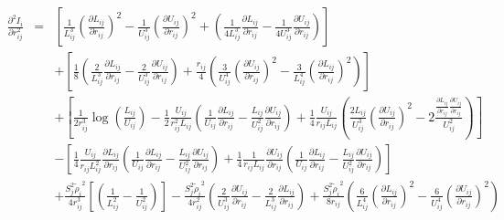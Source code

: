 \documentclass[12pt]{article}
\begin{document}
\begin{eqnarray}
\label{eq:BurialTerm2ndDerv}
\frac{\partial^{2}I_{i}}{\partial r_{ij}^{2}} & = & \left[ \frac{1}{L_{ij}^{3}}\left(\frac{\partial L_{ij}}{\partial r_{ij}}\right)^{2}
- \frac{1}{U_{ij}^{3}}\left(\frac{\partial U_{ij}}{\partial r_{ij}}\right)^{2} + \left(\frac{1}{4L_{ij}^{3}}\frac{\partial L_{ij}}{\partial r_{ij}} - \frac{1}{4U_{ij}^{3}}\frac{\partial U_{ij}}{\partial r_{ij}} \right)\right] \\ \nonumber
& & +  \left[ \frac{1}{8}\left(\frac{2}{L_{ij}^{3}} \frac{\partial L_{ij}}{\partial r_{ij}} - \frac{2}{U_{ij}^{3}} \frac{\partial U_{ij}}{\partial r_{ij}} \right) + \frac{r_{ij}}{4}\left(\frac{3}{U_{ij}^{4}}\left(\frac{\partial U_{ij}}{\partial r_{ij}} \right)^{2}    - \frac{3}{L_{ij}^{4}}\left(\frac{\partial L_{ij}}{\partial r_{ij}} \right)^{2} \right)\right] \\ \nonumber
& & + \left[ \frac{1}{2r_{ij}^{3}}\log(\frac{L_{ij}}{U_{ij}}) - \frac{1}{2} \frac{U_{ij}}{r_{ij}^{2}L_{ij}} \left( \frac{1}{U_{ij}}\frac{\partial L_{ij}}{\partial r_{ij}} - \frac{L_{ij}}{U_{ij}^{2}}\frac{\partial U_{ij}}{\partial r_{ij}} \right)
+\frac{1}{4}\frac{U_{ij}}{r_{ij}L_{ij}}\left(\frac{2L_{ij}}{U_{ij}^{3}}\left(\frac{\partial U_{ij}}{\partial r_{ij}}\right)^{2} - 2\frac{\frac{\partial L_{ij}}{\partial r_{ij}}\frac{\partial U_{ij}}{\partial r_{ij}}}{U_{ij}^{2}} \right) \right] \\ \nonumber
& & - \left[ \frac{1}{4}\frac{U_{ij}}{r_{ij}L_{ij}^2}\frac{\partial L_{ij}}{\partial r_{ij}}\left( \frac{1}{U_{ij}}\frac{\partial L_{ij}}{\partial r_{ij}} - \frac{L_{ij}}{U_{ij}^{2}}\frac{\partial U_{ij}}{\partial r_{ij}} \right) +  \frac{1}{4}\frac{1}{r_{ij}L_{ij}}\frac{\partial U_{ij}}{\partial r_{ij}}\left(\frac{1}{U_{ij}}\frac{\partial L_{ij}}{\partial r_{ij}} - \frac{L_{ij}}{U_{ij}^{2}}\frac{\partial U_{ij}}{\partial r_{ij}} \right) \right] \\ \nonumber
& & + \frac{S_{j}^{2}{{\tilde{\rho}_{i}}}^{2}}{4r_{ij}^{3}}\left[\left(\frac{1}{L_{ij}^2} - \frac{1}{U_{ij}^2} \right) \right]
-\frac{S_{j}^{2}{{\tilde{\rho}_{i}}}^{2}}{4r_{ij}^{2}}\left( \frac{2}{U_{ij}^{3}}\frac{\partial U_{ij}}{\partial r_{ij}}
- \frac{2}{L_{ij}^{3}}\frac{\partial L_{ij}}{\partial r_{ij}}\right) + \frac{S_{j}^{2}{{\tilde{\rho}_{i}}}^{2}}{8r_{ij}}\left(\frac{6}{L_{ij}^{4}} \left(\frac{\partial L_{ij}}{\partial r_{ij}} \right)^{2} - \frac{6}{U_{ij}^{4}} \left(\frac{\partial U_{ij}}{\partial r_{ij}} \right)^{2} \right)
\end{eqnarray}
\end{document}
